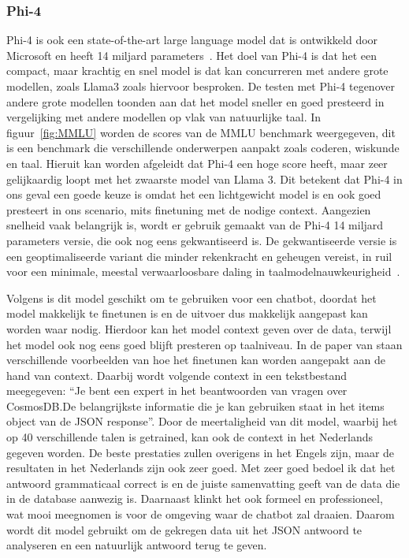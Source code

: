 \subsubsection{Phi-4}{\label{sec:phi4}}
Phi-4 is ook een state-of-the-art large language model dat is ontwikkeld door Microsoft en heeft 14 miljard parameters~\autocite{Kamar2024}.
Het doel van Phi-4 is dat het een compact, maar krachtig en snel model is dat kan concurreren met andere grote modellen, zoals Llama3 zoals hiervoor besproken.
De testen met Phi-4 tegenover andere grote modellen toonden aan dat het model sneller en goed presteerd in vergelijking met andere modellen op vlak van natuurlijke taal.
In figuur~\ref{fig:MMLU} worden de scores van de MMLU benchmark weergegeven, dit is een benchmark die verschillende onderwerpen aanpakt zoals coderen, wiskunde en taal.
Hieruit kan worden afgeleidt dat Phi-4 een hoge score heeft, maar zeer gelijkaardig loopt met het zwaarste model van Llama 3.
Dit betekent dat Phi-4 in ons geval een goede keuze is omdat het een lichtgewicht model is en ook goed presteert in ons scenario, mits finetuning met de nodige context.
Aangezien snelheid vaak belangrijk is, wordt er gebruik gemaakt van de Phi-4 14 miljard parameters versie, die ook nog eens gekwantiseerd is.
De gekwantiseerde versie is een geoptimaliseerde variant die minder rekenkracht en geheugen vereist, in ruil voor een minimale, meestal verwaarloosbare daling in taalmodelnauwkeurigheid~\autocite{Qdrant25}.

Volgens \textcite{microsoft2024phi4} is dit model geschikt om te gebruiken voor een chatbot, doordat het model makkelijk te finetunen is en de uitvoer dus makkelijk aangepast kan worden waar nodig.
Hierdoor kan het model context geven over de data, terwijl het model ook nog eens goed blijft presteren op taalniveau.
In de paper van \textcite{microsoft2024phi4} staan verschillende voorbeelden van hoe het finetunen kan worden aangepakt aan de hand van context.
Daarbij wordt volgende context in een tekstbestand meegegeven: ``Je bent een expert in het beantwoorden van vragen over CosmosDB.\@ De belangrijkste informatie die je kan gebruiken staat in het items object van de JSON response''.
Door de meertaligheid van dit model, waarbij het op 40 verschillende talen is getrained, kan ook de context in het Nederlands gegeven worden.
De beste prestaties zullen overigens in het Engels zijn, maar de resultaten in het Nederlands zijn ook zeer goed.
Met zeer goed bedoel ik dat het antwoord grammaticaal correct is en de juiste samenvatting geeft van de data die in de database aanwezig is.
Daarnaast klinkt het ook formeel en professioneel, wat mooi meegnomen is voor de omgeving waar de chatbot zal draaien.
Daarom wordt dit model gebruikt om de gekregen data uit het JSON antwoord te analyseren en een natuurlijk antwoord terug te geven.

